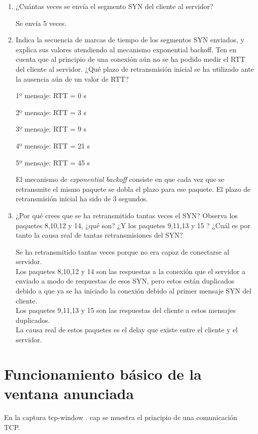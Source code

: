 \documentclass[12pt, a4paper]{report}
\begin{document}
\begin{enumerate}
	\item ¿Cuántas veces se envía el segmento SYN del cliente al servidor? 
	
	Se envía 5 veces.
	
	\item Indica la secuencia de marcas de tiempo de los segmentos SYN enviados, y explica sus valores atendiendo al mecanismo exponential backoff. Ten en cuenta que al principio de una conexión aún no se ha podido medir el RTT del cliente al servidor. ¿Qué plazo de retransmisión inicial se ha utilizado ante la ausencia aún de un valor de RTT?
	
	1º mensaje: RTT = 0 s
	
	2º mensaje: RTT = 3 s
	
	3º mensaje: RTT = 9 s
	
	4º mensaje: RTT = 21 s
	
	5º mensaje: RTT = 45 s
	
	El mecanismo de \textit{exponential backoff} consiste en que cada vez que se retransmite el mismo paquete se dobla el plazo para ese paquete. El plazo de retransmisión inicial ha sido de 3 segundos.
	
	
	\item ¿Por qué crees que se ha retransmitido tantas veces el SYN? Observa los paquetes 8,10,12 y 14, ¿qué son? ¿Y los paquetes 9,11,13 y 15 ? ¿Cuál es por tanto la causa real de tantas retransmisiones del SYN?
	
	Se ha retransmitido tantas veces porque no era capaz de conectarse al servidor.\\
	Los paquetes 8,10,12 y 14 son las respuestas a la conexión que el servidor a enviado a modo de respuestas de esos SYN, pero estos están duplicados debido a que ya se ha iniciado la conexión debido al primer mensaje SYN del cliente.\\
	Los paquetes 9,11,13 y 15 son las respuestas del cliente a estos mensajes duplicados.\\
	La causa real de estos paquetes es el delay que existe entre el cliente y el servidor.
	
\end{enumerate}

\section{Funcionamiento básico de la ventana anunciada}
En la captura tcp-window . cap se muestra el principio de una comunicación TCP.
\end{document}
